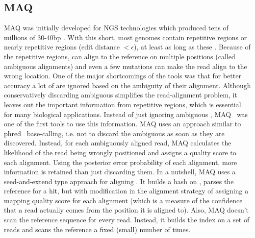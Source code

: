 \subsection{MAQ~\citep{maq}} \label{maq}
MAQ was initially developed for NGS technologies which produced tens of millions of 30-40bp \reads. With \reads this short, most genomes contain repetitive regions or nearly repetitive regions (edit distance $< \epsilon$), at least as long as these \reads. Because of the repetitive regions, \reads can align to the reference on multiple positions (called ambiguous alignments) and even a few mutations can make the read align to the wrong location. One of the major shortcomings of the \ra tools was that for better accuracy a lot of \reads are ignored based on the ambiguity of their alignment. Although conservatively discarding ambiguous \reads simplifies the read-alignment problem, it leaves out the important information from repetitive regions, which is essential for many biological applications. Instead of just ignoring ambiguous \reads, MAQ~\citep{maq} was one of the first tools to use this information. MAQ uses an approach similar to phred~\citep{ewing1998base} base-calling, i.e. not to discard the ambiguous \reads as soon as they are discovered. Instead, for each ambiguously aligned read, MAQ calculates the likelihood of the read being wrongly positioned and assigns a quality score to each alignment. Using the posterior error probability of each alignment, more information is retained than just discarding them. In a nutshell, MAQ uses a seed-and-extend type approach for aligning \reads. It builds a hash on \reads, parses the reference for a hit, but with modification in the alignment strategy of assigning a mapping quality score for each alignment (which is a measure of the confidence that a read actually comes from the position it is aligned to). Also, MAQ doesn't scan the reference sequence for every read. Instead, it builds the index on a set of reads and scans the reference a fixed (small) number of times.

